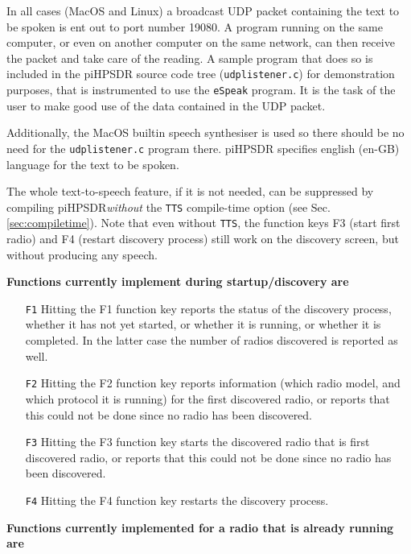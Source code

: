 \documentclass[12pt]{book}
\def\rett#1{\texttt{\color{red}#1}}
\def\pH{pi\-HPSDR\xspace}
\begin{document}
In all cases (MacOS and Linux) a broadcast UDP packet containing the text to be spoken
is ent out to port number 19080. A program running on the same computer, or even on another
computer on the same network, can
then receive the packet and take care of the reading. A sample program that does so
is included in the \pH source code tree (\texttt{udplistener.c}) for demonstration purposes,
that is instrumented to use  the \texttt{eSpeak} program. It is the task of the user to
make good use of the data contained in the UDP packet.

Additionally, the MacOS builtin speech synthesiser is used so there should be no need
for the \texttt{udplistener.c} program there. \pH specifies english (en-GB)
language for the text to be spoken.

The whole text-to-speech feature, if it is not needed, can be suppressed by compiling
\pH \textit{without} the \texttt{TTS} compile-time option (see Sec. \ref{sec:compiletime}).
Note that even without \texttt{TTS},
the function keys F3 (start first radio) and F4 (restart
discovery process) still work on the discovery screen, but without producing any speech.

\textbf{Functions currently implement during startup/discovery are}

\begin{itemize}
\item[\rett{F1}]{Hitting the F1 function key reports the status of the discovery process,
whether it has not yet started, or whether it is running, or whether it is completed.
In the latter case the number of radios discovered is reported as well.}

\item[\rett{F2}]{Hitting the F2 function key reports information (which radio model, and
which protocol it is running) for the first discovered radio,
or reports that  this could not be done since no radio has been
discovered.}

\item[\rett{F3}]{Hitting the F3 function key starts the discovered radio that is first
discovered radio, or reports that  this could not be done since no radio has been
discovered.}
\item[\rett{F4}]{Hitting the F4 function key restarts the discovery process.}
\end{itemize}

\textbf{Functions currently implemented for a radio that is  already running are}
\end{document}
